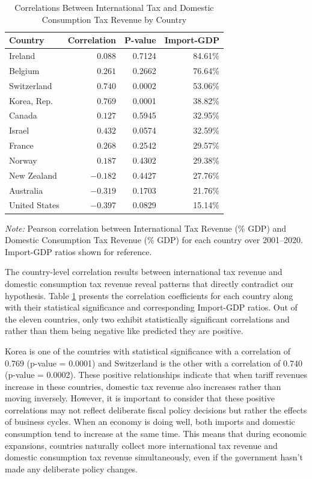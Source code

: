 \documentclass[12pt]{article}
\begin{document}
\begin{table}[!htbp]
\centering
\caption{Correlations Between International Tax and Domestic Consumption Tax Revenue by Country}
\label{tab:correlations_individual}
\begin{threeparttable}
\begin{tabular}{lrrr}
\toprule
\textbf{Country} & \textbf{Correlation} & \textbf{P-value} & \textbf{Import-GDP} \\
\midrule
Ireland & $0.088$ & 0.7124 & 84.61\% \\
Belgium & $0.261$ & 0.2662 & 76.64\% \\
Switzerland & $0.740$ & 0.0002 & 53.06\% \\
Korea, Rep. & $0.769$ & 0.0001 & 38.82\% \\
Canada & $0.127$ & 0.5945 & 32.95\% \\
Israel & $0.432$ & 0.0574 & 32.59\% \\
France & $0.268$ & 0.2542 & 29.57\% \\
Norway & $0.187$ & 0.4302 & 29.38\% \\
New Zealand & $-0.182$ & 0.4427 & 27.76\% \\
Australia & $-0.319$ & 0.1703 & 21.76\% \\
United States & $-0.397$ & 0.0829 & 15.14\% \\
\bottomrule
\end{tabular}
\begin{tablenotes}
\small
\item \textit{Note:} Pearson correlation between International Tax Revenue (\% GDP) and Domestic Consumption Tax Revenue (\% GDP) for each country over 2001–2020.  Import-GDP ratios shown for reference.
\end{tablenotes}
\end{threeparttable}
\end{table}

        The country-level correlation results between international tax revenue and domestic consumption tax revenue reveal patterns that directly contradict our hypothesis. Table \ref{tab:correlations_individual} presents the correlation coefficients for each country along with their statistical significance and corresponding Import-GDP ratios. Out of the eleven countries, only two exhibit statistically significant correlations and rather than them being negative like predicted they are positive. 

        Korea is one of the countries with statistical significance with a correlation of 0.769 (p-value = 0.0001) and Switzerland is the other with a correlation of 0.740 (p-value = 0.0002). These positive relationships indicate that when tariff revenues increase in these countries, domestic tax revenue also increases rather than moving inversely. However, it is important to consider that these positive correlations may not reflect deliberate fiscal policy decisions but rather the effects of business cycles. When an economy is doing well, both imports and domestic consumption tend to increase at the same time. This means that during economic expansions, countries naturally collect more international tax revenue and domestic consumption tax revenue simultaneously, even if the government hasn't made any deliberate policy changes. 
        
\end{document}
